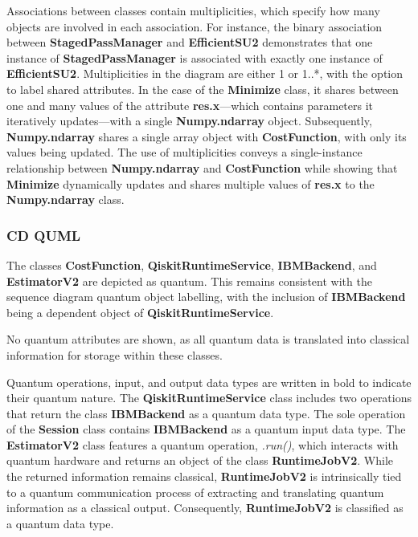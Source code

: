 \documentclass{article}
\begin{document}
Associations between classes contain multiplicities, which specify how many objects are involved in each association. For instance, the binary association between \textbf{StagedPassManager} and \textbf{EfficientSU2} demonstrates that one instance of \textbf{StagedPassManager} is associated with exactly one instance of \textbf{EfficientSU2}. Multiplicities in the diagram are either 1 or 1..*, with the option to label shared attributes. In the case of the \textbf{Minimize} class, it shares between one and many values of the attribute \textbf{res.x}—which contains parameters it iteratively updates—with a single \textbf{Numpy.ndarray} object. 
Subsequently, \textbf{Numpy.ndarray} shares a single array object with \textbf{CostFunction}, with only its values being updated. The use of multiplicities conveys a single-instance relationship between \textbf{Numpy.ndarray} and \textbf{CostFunction} while showing that \textbf{Minimize} dynamically updates and shares multiple values of \textbf{res.x} to the \textbf{Numpy.ndarray} class.

\subsubsection{CD QUML}

The classes \textbf{CostFunction}, \textbf{QiskitRuntimeService}, \textbf{IBMBackend}, and \textbf{EstimatorV2} are depicted as quantum. This remains consistent with the sequence diagram quantum object labelling, with the inclusion of \textbf{IBMBackend} being a dependent object of \textbf{QiskitRuntimeService}.

No quantum attributes are shown, as all quantum data is translated into classical information for storage within these classes.

Quantum operations, input, and output data types are written in bold to indicate their quantum nature. The \textbf{QiskitRuntimeService} class includes two operations that return the class \textbf{IBMBackend} as a quantum data type. The sole operation of the \textbf{Session} class contains \textbf{IBMBackend} as a quantum input data type. The \textbf{EstimatorV2} class features a quantum operation, \textit{.run()}, which interacts with quantum hardware and returns an object of the class \textbf{RuntimeJobV2}. While the returned information remains classical, \textbf{RuntimeJobV2} is intrinsically tied to a quantum communication process of extracting and translating quantum information as a classical output. Consequently, \textbf{RuntimeJobV2} is classified as a quantum data type.
\end{document}
